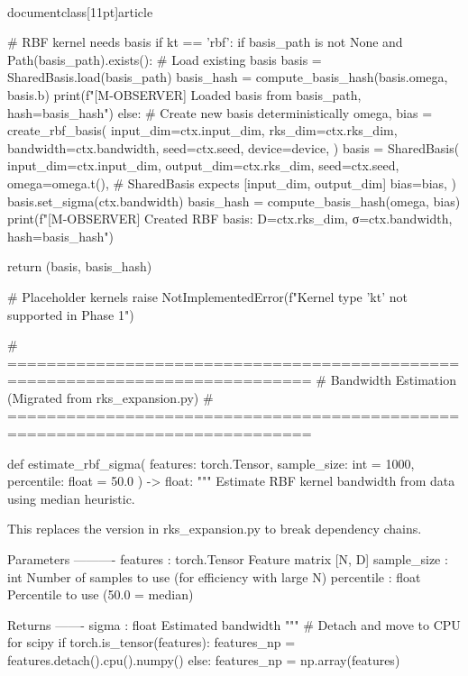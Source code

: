 \\documentclass[11pt]{article}
\begin{document}
\begin{CodeBlock}
    # RBF kernel needs basis
    if kt == 'rbf':
        if basis_path is not None and Path(basis_path).exists():
            # Load existing basis
            basis = SharedBasis.load(basis_path)
            basis_hash = compute_basis_hash(basis.omega, basis.b)
            print(f"[M-OBSERVER] Loaded basis from {basis_path}, hash={basis_hash}")
        else:
            # Create new basis deterministically
            omega, bias = create_rbf_basis(
                input_dim=ctx.input_dim,
                rks_dim=ctx.rks_dim,
                bandwidth=ctx.bandwidth,
                seed=ctx.seed,
                device=device,
            )
            basis = SharedBasis(
                input_dim=ctx.input_dim,
                output_dim=ctx.rks_dim,
                seed=ctx.seed,
                omega=omega.t(),  # SharedBasis expects [input_dim, output_dim]
                bias=bias,
            )
            basis.set_sigma(ctx.bandwidth)
            basis_hash = compute_basis_hash(omega, bias)
            print(f"[M-OBSERVER] Created RBF basis: D={ctx.rks_dim}, σ={ctx.bandwidth}, hash={basis_hash}")
        
        return (basis, basis_hash)
    
    # Placeholder kernels
    raise NotImplementedError(f"Kernel type '{kt}' not supported in Phase 1")


# =============================================================================
# Bandwidth Estimation (Migrated from rks_expansion.py)
# =============================================================================

def estimate_rbf_sigma(
    features: torch.Tensor,
    sample_size: int = 1000,
    percentile: float = 50.0
) -> float:
    """
    Estimate RBF kernel bandwidth from data using median heuristic.
    
    This replaces the version in rks_expansion.py to break dependency chains.
    
    Parameters
    ----------
    features : torch.Tensor
        Feature matrix [N, D]
    sample_size : int
        Number of samples to use (for efficiency with large N)
    percentile : float
        Percentile to use (50.0 = median)
        
    Returns
    -------
    sigma : float
        Estimated bandwidth
    """
    # Detach and move to CPU for scipy
    if torch.is_tensor(features):
        features_np = features.detach().cpu().numpy()
    else:
        features_np = np.array(features)
    

\end{CodeBlock}
\end{document}
